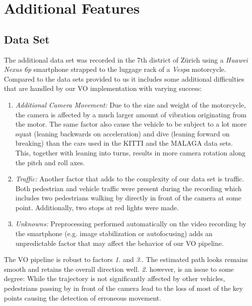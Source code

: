 \chapter{Additional Features}
\section{Data Set}
\label{dataset}

The additional data set was recorded in the 7th district of Zürich using a \emph{Huawei Nexus 6p} smartphone strapped to the luggage rack of a \emph{Vespa} motorcycle. 
Compared to the data sets provided to us it includes some additional difficulties that are handled by our VO implementation with varying success:

\begin{enumerate}
\item \emph{Additional Camera Movement:} Due to the size and weight of the motorcycle, the camera is affected by a much larger amount of vibration originating from the motor. 
The same factor also cause the vehicle to be subject to a lot more squat (leaning backwards on acceleration) and dive (leaning forward on breaking) than the cars used in the KITTI and the MALAGA data sets. 
This, together with leaning into turns, results in more camera rotation along the pitch and roll axes.

\item \emph{Traffic:} Another factor that adds to the complexity of our data set is traffic. 
Both pedestrian and vehicle traffic were present during the recording which includes two pedestrians walking by directly in front of the camera at some point.
Additionally, two stops at red lights were made.

\item \emph{Unknowns:} Preprocessing performed automatically on the video recording by the smartphone (e.g. image stabilization or autofocusing) adds an unpredictable factor that may affect the behavior of our VO pipeline.
\end{enumerate}

The VO pipeline is robust to factors \emph{1.} and \emph{3.}. 
The estimated path looks remains smooth and retains the overall direction well. 
\emph{2.} however, is an issue to some degree: While the trajectory is not significantly affected by other vehicles, pedestrians passing by in front of the camera lead to the loss of most of the key points causing the detection of erroneous movement.

